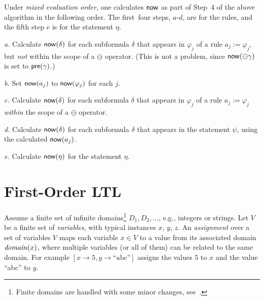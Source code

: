 Under {\em mixed evaluation order}, one calculates $\mathsf{now}$ as part of Step~4 of the above algorithm in the following order. The first~four steps, $a$-$d$, are for the rules, and the fifth step $e$ is for the statement $\eta$.
\begin{description}
\item{\em a.} Calculate 
$\mathsf{now} ( \delta )$ for each subformula $\delta$
that appears in $\varphi_j$ of a rule
$a_j := \varphi_j$, but {\em not} within the scope of
a $\ominus$ operator. (This is not
a problem, since
$\mathsf{now} ( \ominus \gamma )$ is set to $\mathsf{pre} ( \gamma )$.)
\item{\em b.} Set 
$\mathsf{now} ( a_j )$ to $\mathsf{now} ( \varphi_j )$ for each $j$.
\item{\em c.} Calculate $\mathsf{now} ( \delta )$ for each subformula $\delta$
that appears in $\varphi_j$ of a rule
$a_j := \varphi_j$ {\em  within} the scope of
a $\ominus$ operator.
\item{\em d.} Calculate $\mathsf{now} ( \delta )$ for each subformula $\delta$
that appears in the statement $\psi$, using the calculated $\mathsf{now} ( a_j )$.
\item{\em e.} Calculate $\mathsf{now} ( \eta )$ for the statement
$\eta$.
\end{description}



\section{First-Order LTL}

\label{sec:syntax-semantics}

Assume a finite set of infinite domains\footnote{Finite domains are handled with some minor changes, see~\cite{HPU}.}
$D_1, D_2, \ldots$,
e.g., integers or strings. 
Let $V$ be a finite set of {\em variables}, 
with typical instances $x$, $y$, $z$.
An {\em assignment} over a set of variables $V$
maps each variable $x \in V$ to a value from
its associated domain $\mathit{domain} ( x )$, where multiple variables (or all of them)
can be related to the same domain. For example
$[ x \rightarrow 5 , y \rightarrow \text{``abc''} ]$ assigns
the values $5$ to $x$ and the value ``abc'' to $y$.


